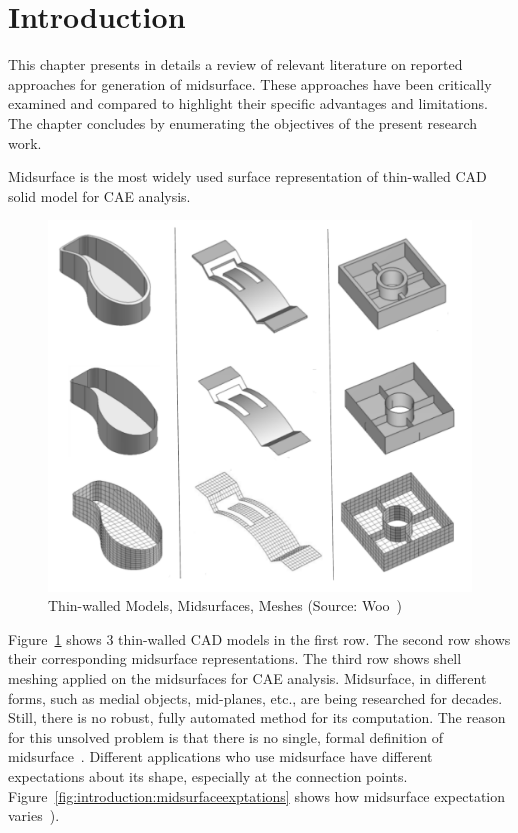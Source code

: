 \section{Introduction} \label{sec:survey:intro}

This chapter presents in details a review of relevant literature on reported approaches for generation of midsurface. These approaches have been critically examined and compared to highlight their specific advantages and limitations. The chapter concludes by enumerating the objectives of the present research work.


Midsurface is the most widely used surface representation of thin-walled CAD solid model for CAE analysis. 


		\begin{figure} [!h]
		\centering
		\includegraphics[width=0.75\linewidth]{..//Common/images/WooMidsurfaces.pdf}
		\caption{Thin-walled Models, Midsurfaces, Meshes (Source: Woo~\cite{Woo2013})}
		\label{fig:introduction:woomids}
	\end{figure}
	

Figure~\ref{fig:introduction:woomids} shows 3 thin-walled CAD models in the first row. The second row shows their corresponding midsurface representations. The third row shows shell meshing applied on the midsurfaces for CAE analysis. Midsurface, in different forms, such as medial objects, mid-planes, etc., are being researched for decades. Still, there is no robust, fully automated method for its computation. The reason for this unsolved problem is that there is no single, formal definition of midsurface~\cite{Ramanathan2004}. Different applications who use midsurface have different expectations about its shape, especially at the connection points. Figure~\ref{fig:introduction:midsurfaceexptations} shows how midsurface expectation varies~\cite{Woo2013}).


